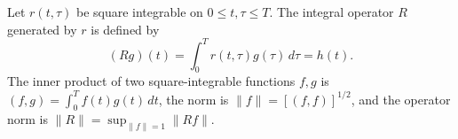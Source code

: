 Let $r(t,\tau)$ be square integrable on $0 \leq t, \tau \leq T$. The integral operator $R$ generated by $r$ is defined by
$$(Rg)(t) = \int_0^T r(t,\tau) g(\tau) \, d\tau = h(t).$$
The inner product of two square-integrable functions $f, g$ is $(f,g) = \int_0^T f(t) g(t) \, dt$, the norm is $\|f\| = [(f,f)]^{1/2}$, and the operator norm is $\|R\| = \sup_{\|f\| = 1} \|Rf\|$.
